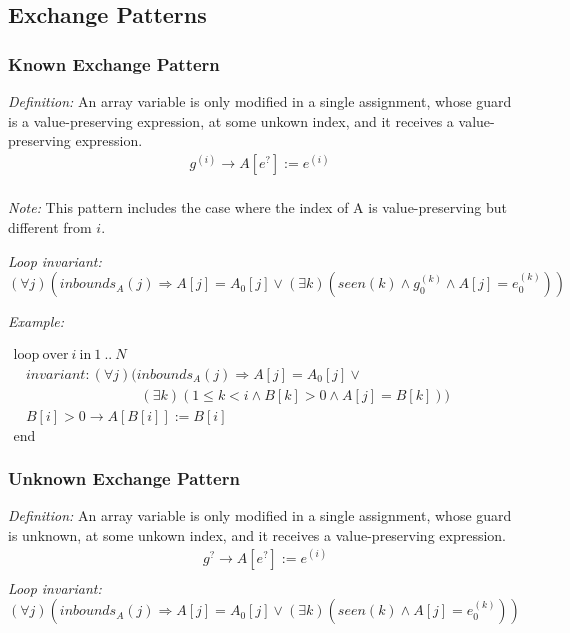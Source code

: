 \documentclass[a4paper,10pt]{article}
\newcommand{\idx}{\ensuremath{i}\xspace}
\newcommand{\at}[1]{{(#1)}}
\newcommand{\KWloop}{\ensuremath{\mathrm{loop}~}}
\newcommand{\KWend}{\ensuremath{\mathrm{end}~}}
\newcommand{\KWover}{\ensuremath{\mathrm{over}~}}
\newcommand{\KWin}{\ensuremath{~\mathrm{in}~}}
\newcommand{\impl}{\ensuremath{\Longrightarrow}}
\newcommand{\inbounds}[2]{\ensuremath{\mathit{inbounds}_{#1}(#2)}\xspace}
\newcommand{\seen}[1]{\ensuremath{\mathit{seen}(#1)}\xspace}
\newcommand{\loopinvariant}{\noindent\textit{Loop invariant:}\xspace}
\newcommand{\patterndef}{\noindent\textit{Definition:}\xspace}
\newcommand{\patternexample}{\noindent\textit{Example:}\xspace}
\newcommand{\patternnote}{\noindent\textit{Note:}\xspace}
\begin{document}
\subsection{Exchange Patterns}

\subsubsection*{Known Exchange Pattern}

\patterndef An array variable is only modified in a single assignment,
whose guard is a value-preserving expression, at some unkown index, 
and it receives a value-preserving expression.
%
\begin{eqnarray*}
g^\at{\idx} \rightarrow A[e^?] := e^\at{\idx}\\
\end{eqnarray*}

%
\patternnote This pattern includes the case where the index of A is value-preserving but different from $i$.

\medskip
%
\loopinvariant
%
$$(\forall j)(\inbounds{A}{j} \impl A[j] = A_0[j] \lor (\exists k)(\seen{k} \land g_0^\at{k} \land A[j] = e_0^\at{k}))$$

\bigskip
\patternexample

\medskip
$\begin{array}{l}
  \KWloop \KWover i \KWin 1~..~N \\
  ~~~~ \textit{invariant}: (\forall j)(\inbounds{A}{j} \impl A[j] = A_0[j] \lor \\ 
  ~~~~~~~~~~~~~~~~~~~~~~~~~~~~~~~~~~~~~~~~~ (\exists k)(1 \leq k < i \land B[k] > 0 \land A[j] = B[k]))\\
  ~~~~ B[i] > 0 \rightarrow A[B[i]] := B[i]\\
  \KWend
\end{array}$

\subsubsection*{Unknown Exchange Pattern}

\patterndef An array variable is only modified in a single assignment,
whose guard is unknown, at some unkown index, and it receives a value-preserving expression.
%
\begin{eqnarray*}
&g^? \rightarrow A[e^?] := e^\at{\idx}\\
\end{eqnarray*}
%
\loopinvariant
%
$$(\forall j)(\inbounds{A}{j} \impl A[j] = A_0[j] \lor (\exists k)(\seen{k} \land A[j] = e_0^\at{k}))$$
\end{document}
